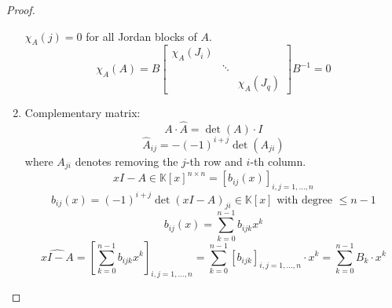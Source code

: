 \documentclass[a4paper]{article}
\numberwithin{lecref}{section}
\begin{document}
\begin{proof}
\begin{enumerate}
      $\chi_A(j) = 0$ for all Jordan blocks of $A$.
      \[ \chi_A(A) = B \begin{bmatrix} \chi_A(J_i) & & \\ & \ddots & \\ & & \chi_A(J_q) \end{bmatrix} B^{-1} = 0 \]
    \item {} Complementary matrix:
      \[ A \cdot \widehat{A} = \det(A) \cdot I \]
      \[ \widehat{A}_{ij} = -(-1)^{i+j} \det(A_{ji}) \]
      where $A_{ji}$ denotes removing the $j$-th row and $i$-th column.
      \[ \widehat{xI - A} \in \mathbb K[x]^{n \times n} = [b_{ij}(x)]_{i,j=1,\dots,n} \]
      \[ b_{ij}(x) = (-1)^{i+j} \det(xI - A)_{ji} \in \mathbb K[x] \text{ with degree } \leq n-1 \]
      \[ b_{ij}(x) = \sum_{k=0}^{n-1} b_{ijk} x^k \]
      \[
        \widehat{xI - A}
          = \left[\sum_{k=0}^{n-1} b_{ijk} x^k\right]_{i,j=1,\dots,n}
          = \sum_{k=0}^{n-1} [b_{ijk}]_{i,j=1,\dots,n} \cdot x^k
          = \sum_{k=0}^{n-1} B_k \cdot x^k
      \]


\end{enumerate}
\end{proof}
\end{document}
